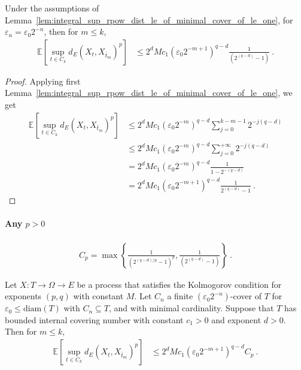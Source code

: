 \begin{corollary}\label{cor:integral_sup_rpow_dist_le_of_minimal_cover_two_of_le_one}
  \leanok
Under the assumptions of Lemma~\ref{lem:integral_sup_rpow_dist_le_of_minimal_cover_of_le_one}, for $\varepsilon_n = \varepsilon_0 2^{-n}$, then for $m \le k$,
\begin{align*}
  \mathbb{E} \left[\sup_{t \in C_k} d_E(X_t, X_{\bar{t}_m})^p \right]
  &\le 2^d M c_1 (\varepsilon_0 2^{-m + 1})^{q - d} \frac{1}{\left( 2^{(q -d)} - 1\right)}
  \: .
\end{align*}
\end{corollary}

\begin{proof}
Applying first Lemma~\ref{lem:integral_sup_rpow_dist_le_of_minimal_cover_of_le_one}, we get
\begin{align*}
  \mathbb{E} \left[\sup_{t \in C_k} d_E(X_t, X_{\bar{t}_m})^p \right]
  &\le 2^d M c_1 (\varepsilon_0 2^{-m})^{q-d}\sum_{j=0}^{k-m-1} 2^{- j (q - d)}
  \\
  &\le 2^d M c_1 (\varepsilon_0 2^{-m})^{q-d}\sum_{j=0}^{+\infty} 2^{- j (q - d)}
  \\
  &= 2^d M c_1 (\varepsilon_0 2^{-m})^{q-d} \frac{1}{1 - 2^{-(q - d)}}
  \\
  &= 2^d M c_1 (\varepsilon_0 2^{-m+1})^{q-d} \frac{1}{2^{(q - d)} - 1}
  \: .
\end{align*}
\end{proof}


\paragraph{Any $p>0$}


\begin{definition}\label{def:Cp}
  \leanok
\begin{align*}
  C_p = \max\left\{\frac{1}{\left( 2^{(q -d)/p} - 1\right)^p}, \frac{1}{\left( 2^{(q -d)} - 1\right)} \right\}
  \: .
\end{align*}
\end{definition}


\begin{lemma}\label{lem:second_term_bound}
  \leanok
Let $X : T \to \Omega \to E$ be a process that satisfies the Kolmogorov condition for exponents $(p,q)$ with constant $M$.
Let $C_n$ a finite $(\varepsilon_0 2^{-n})$-cover of $T$ for $\varepsilon_0 \le \mathrm{diam}(T)$ with $C_n \subseteq T$, and with minimal cardinality.
Suppose that $T$ has bounded internal covering number with constant $c_1>0$ and exponent $d > 0$.
Then for $m \le k$,
\begin{align*}
  \mathbb{E} \left[\sup_{t \in C_k} d_E(X_t, X_{\bar{t}_m})^p \right]
  &\le 2^d M c_1 (\varepsilon_0 2^{-m + 1})^{q - d} C_p
  \: .
\end{align*}
\end{lemma}

